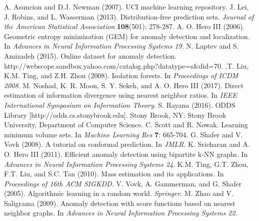 \documentclass[a4paper, 11pt]{article}
\begin{document}


\begin{thebibliography}{9}
 A. Asuncion and D.J. Newman (2007). UCI machine learning repository.
 J. Lei, J. Robins, and L. Wasserman (2013). Distribution-free prediction sets.
\emph{Journal of the American Statistical Association} \textbf{108}(501): 278-287.
 A. O. Hero III (2006). Geometric entropy minimization (GEM) for anomaly detection and localization. In \emph{Advances in Neural Information Processing Systems 19}.
 N. Laptev and S. Amizadeh (2015). Online dataset for anomaly detection. http://webscope.sandbox.yahoo.com/catalog.php?datatype=s\&did=70.
.T. Liu, K.M. Ting, and Z.H. Zhou (2008). Isolation forests. In \emph{Proceedings of ICDM 2008}.
 M. Noshad, K. R. Moon, S. Y. Sekeh, and A. O. Hero III (2017). Direct estimation of information divergence using nearest neighbor ratios. In \emph{IEEE International Symposium on Information Theory}.
 S. Rayana (2016). ODDS Library [http://odds.cs.stonybrook.edu]. Stony Brook, NY: Stony Brook University, Department of Computer Science.
 C. Scott and R. Nowak. Learning minimum volume sets. In \emph{Machine Learning Res} \textbf{7}: 665-704.
G. Shafer and V. Vovk (2008). A tutorial on conformal prediction. In \emph{JMLR}.
 K. Sricharan and A. O. Hero III (2011). Efficient anomaly detection using bipartite k-NN graphs. In \emph{Advances in Neural Information Processing Systems 24}.
 K.M. Ting, G.T. Zhou, F.T. Liu, and S.C. Tan (2010). Mass estimation and its applications. In \emph{Proceedings of 16th ACM SIGKDD}.
 V. Vovk, A. Gammerman, and G. Shafer (2005). Algorithmic learning in a random world. \emph{Springer}.
 M. Zhao and V. Saligrama (2009). Anomaly detection with score functions based on nearest neighbor graphs. In \emph{Advances in Neural Information Processing Systems 22}.
\end{thebibliography}
\end{document}
